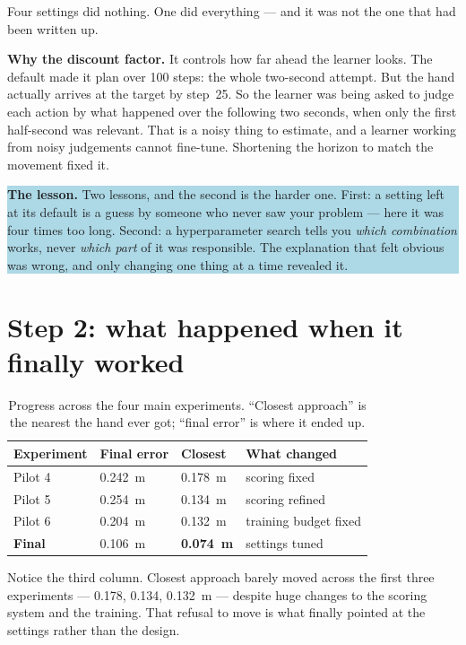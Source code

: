 \documentclass[11pt, a4paper]{article}
\newcommand{\lesson}[1]{%
  \par\vspace{4pt}%
  \noindent\colorbox{lightblue}{\parbox{\dimexpr\linewidth-2\fboxsep}{%
  \textbf{The lesson.} #1}}\par\vspace{4pt}}
\begin{document}
Four settings did nothing. One did everything --- and it was not the one that had
been written up.

\textbf{Why the discount factor.} It controls how far ahead the learner looks.
The default made it plan over 100 steps: the whole two-second attempt. But the
hand actually arrives at the target by step~25. So the learner was being asked to
judge each action by what happened over the following two seconds, when only the
first half-second was relevant. That is a noisy thing to estimate, and a learner
working from noisy judgements cannot fine-tune. Shortening the horizon to match
the movement fixed it.

\lesson{Two lessons, and the second is the harder one. First: a setting left at
its default is a guess by someone who never saw your problem --- here it was
four times too long. Second: a hyperparameter search tells you \emph{which
combination} works, never \emph{which part} of it was responsible. The
explanation that felt obvious was wrong, and only changing one thing at a time
revealed it.}

\section{Step 2: what happened when it finally worked}

\begin{table}[h]
\centering
\caption{Progress across the four main experiments. ``Closest approach'' is the
nearest the hand ever got; ``final error'' is where it ended up.}
\small
\begin{tabular}{@{} L{4.6cm} C{2.4cm} C{2.6cm} C{3.0cm} @{}}
\toprule
\textbf{Experiment} & \textbf{Final error} & \textbf{Closest} & \textbf{What changed} \\
\midrule
Pilot 4 & \SI{0.242}{\meter} & \SI{0.178}{\meter} & scoring fixed \\
Pilot 5 & \SI{0.254}{\meter} & \SI{0.134}{\meter} & scoring refined \\
Pilot 6 & \SI{0.204}{\meter} & \SI{0.132}{\meter} & training budget fixed \\
\textbf{Final} & \SI{0.106}{\meter} & \textbf{\SI{0.074}{\meter}} & settings tuned \\
\bottomrule
\end{tabular}
\end{table}

Notice the third column. Closest approach barely moved across the first three
experiments --- \SI{0.178}{}, \SI{0.134}{}, \SI{0.132}{\meter} --- despite huge
changes to the scoring system and the training. That refusal to move is what
finally pointed at the settings rather than the design.
\end{document}
